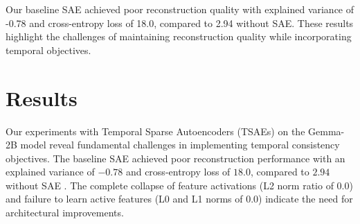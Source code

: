 \documentclass{article} %
\begin{document}
Our baseline SAE achieved poor reconstruction quality with explained variance of -0.78 and cross-entropy loss of 18.0, compared to 2.94 without SAE. These results highlight the challenges of maintaining reconstruction quality while incorporating temporal objectives.

\section{Results}
\label{sec:results}

Our experiments with Temporal Sparse Autoencoders (TSAEs) on the Gemma-2B model reveal fundamental challenges in implementing temporal consistency objectives. The baseline SAE achieved poor reconstruction performance with an explained variance of $-0.78$ and cross-entropy loss of $18.0$, compared to $2.94$ without SAE \cite{karpathy2023nanogpt}. The complete collapse of feature activations (L2 norm ratio of $0.0$) and failure to learn active features (L0 and L1 norms of $0.0$) indicate the need for architectural improvements.
\end{document}
